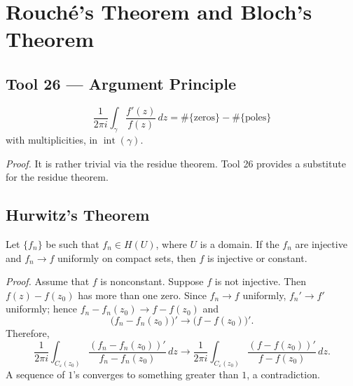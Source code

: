 \documentclass[11pt,a4paper]{article}
\begin{document}
\section*{Rouché's Theorem and Bloch's Theorem}
\subsection*{Tool 26 — Argument Principle}
\label{tool:argument-principle}

\[
  \frac{1}{2\pi i}\int_\gamma\frac{f'(z)}{f(z)}\,dz
  =\#\{\text{zeros}\}-\#\{\text{poles}\}
\]
with multiplicities, in $\operatorname{int}(\gamma)$.


\textit{Proof.}
It is rather trivial via the residue theorem. Tool 26 provides a substitute for the residue theorem.


\subsection*{Hurwitz's Theorem}

Let $\{f_n\}$ be such that $f_n\in H(U)$, where $U$ is a domain. If the $f_n$ are injective and $f_n\to f$ uniformly on compact sets, then $f$ is injective or constant.

\textit{Proof.}
Assume that $f$ is nonconstant.
Suppose $f$ is not injective. Then $f(z)-f(z_0)$ has more than one zero. Since $f_n\to f$ uniformly, $f_n'\to f'$ uniformly; hence \(f_n-f_n(z_0)\longrightarrow f-f(z_0)\)
and
\[
  \bigl(f_n-f_n(z_0)\bigr)'
  \longrightarrow \bigl(f-f(z_0)\bigr)'.
\]
Therefore,
\[
  \frac{1}{2\pi i}\int_{C_\varepsilon(z_0)}
  \frac{(f_n-f_n(z_0))'}{f_n-f_n(z_0)}\,dz
  \longrightarrow
  \frac{1}{2\pi i}\int_{C_\varepsilon(z_0)}
  \frac{(f-f(z_0))'}{f-f(z_0)}\,dz.
\]
A sequence of $1$'s converges to something greater than $1$, a contradiction.

\end{document}

